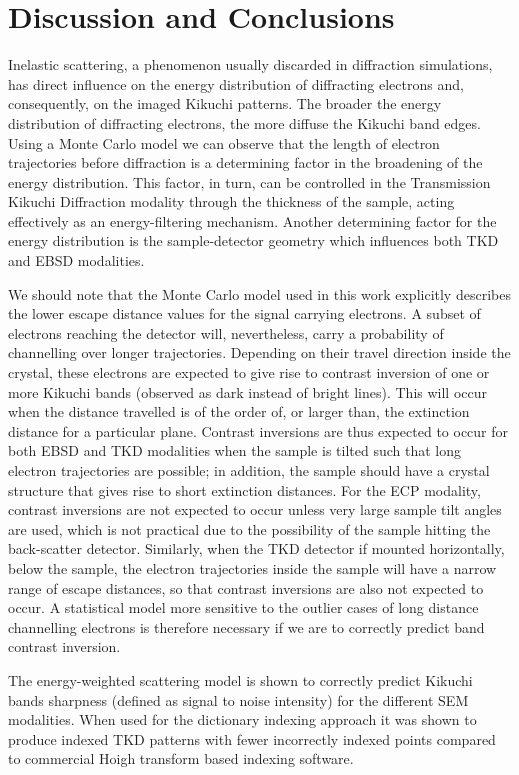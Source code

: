 %
\section{Discussion and Conclusions \label{sec:discussion}}

Inelastic scattering, a phenomenon usually discarded in diffraction simulations, has direct influence on the energy distribution of diffracting electrons and, consequently, on the imaged Kikuchi patterns. The broader the energy distribution of diffracting electrons, the more diffuse the Kikuchi band edges. Using a Monte Carlo model we can observe that the length of electron trajectories before diffraction is a determining factor in the broadening of the energy distribution. This factor, in turn, can be controlled in the Transmission Kikuchi Diffraction modality through the thickness of the sample, acting effectively as an energy-filtering mechanism. Another determining factor for the energy distribution is the sample-detector geometry which influences both TKD and EBSD modalities.



We should note that the Monte Carlo model used in this work explicitly describes the lower escape distance values for the signal carrying electrons.  A subset of electrons reaching the detector will, nevertheless, carry a probability of channelling over longer trajectories. Depending on their travel direction inside the crystal, these electrons are expected to give rise to contrast inversion of one or more Kikuchi bands (observed as dark instead of bright lines). This will occur when the distance travelled is of the order of, or larger than, the extinction distance for a particular plane. Contrast inversions are thus expected to occur for both EBSD and TKD modalities when the sample is tilted such that long electron trajectories are possible; in addition, the sample should have a crystal structure that gives rise to short extinction distances. For the ECP modality, contrast inversions are not expected to occur unless very large sample tilt angles are used, which is not practical due to the possibility of the sample hitting the back-scatter detector. Similarly, when the TKD detector if mounted horizontally, below the sample, the electron trajectories inside the sample will have a narrow range of escape distances, so that contrast inversions are also not expected to occur. A statistical model more sensitive to the outlier cases of long distance channelling electrons is therefore necessary if we are to correctly predict band contrast inversion. 

The energy-weighted scattering model is shown to correctly predict Kikuchi bands sharpness (defined as signal to noise intensity) for the different SEM modalities. When used for the dictionary indexing approach it was shown to produce indexed TKD patterns with fewer incorrectly indexed points compared to commercial Hoigh transform based indexing software. 
